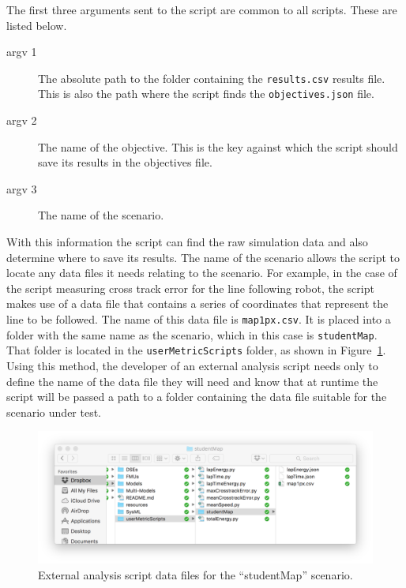 The first three arguments sent to the script are common to all scripts.  These are listed below.
%
%
%
\begin{description}
	\item[argv 1 ] The absolute path to the folder containing the \texttt{results.csv} results file.  This is also the path where the script finds the \newline \texttt{objectives.json} file.
	\item[argv 2 ] The name of the objective.  This is the key against which the script should save its results in the objectives file.
	\item[argv 3 ] The name of the scenario.
\end{description}
%
%
%
With this information the script can find the raw simulation data and also determine where to save its results.  The name of the scenario allows the script to locate any data files it needs relating to the scenario.  For example, in the case of the script measuring cross track error for the line following robot, the script makes use of a data file that contains a series of coordinates that represent the line to be followed.  The name of this data file is \texttt{map1px.csv}.  It is placed into a folder with the same name as the scenario, which in this case is \texttt{student\-Map}.  That folder is located in the \texttt{user\-Metric\-Scripts} folder, as shown in Figure~\ref{fig:dse:externalAnalysisDataLocation}.  Using this method, the developer of an external analysis script needs only to define the name of the data file they will need and know that at runtime the script will be passed a path to a folder containing the data file suitable for the scenario under test.
%
%
%
\begin{figure}[ht]
	\centering
	\includegraphics[width=\textwidth]{figures/dse/externalAnalysisDataLocation}
	\caption{External analysis script data files for the ``studentMap'' scenario.}\label{fig:dse:externalAnalysisDataLocation}
\end{figure}

